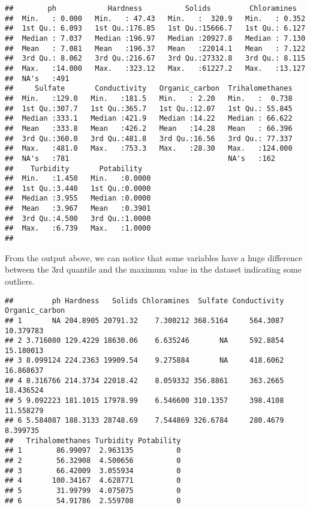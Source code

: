 \documentclass[
]{article}
\begin{document}
\begin{verbatim}
##        ph            Hardness          Solids         Chloramines    
##  Min.   : 0.000   Min.   : 47.43   Min.   :  320.9   Min.   : 0.352  
##  1st Qu.: 6.093   1st Qu.:176.85   1st Qu.:15666.7   1st Qu.: 6.127  
##  Median : 7.037   Median :196.97   Median :20927.8   Median : 7.130  
##  Mean   : 7.081   Mean   :196.37   Mean   :22014.1   Mean   : 7.122  
##  3rd Qu.: 8.062   3rd Qu.:216.67   3rd Qu.:27332.8   3rd Qu.: 8.115  
##  Max.   :14.000   Max.   :323.12   Max.   :61227.2   Max.   :13.127  
##  NA's   :491                                                         
##     Sulfate       Conductivity   Organic_carbon  Trihalomethanes  
##  Min.   :129.0   Min.   :181.5   Min.   : 2.20   Min.   :  0.738  
##  1st Qu.:307.7   1st Qu.:365.7   1st Qu.:12.07   1st Qu.: 55.845  
##  Median :333.1   Median :421.9   Median :14.22   Median : 66.622  
##  Mean   :333.8   Mean   :426.2   Mean   :14.28   Mean   : 66.396  
##  3rd Qu.:360.0   3rd Qu.:481.8   3rd Qu.:16.56   3rd Qu.: 77.337  
##  Max.   :481.0   Max.   :753.3   Max.   :28.30   Max.   :124.000  
##  NA's   :781                                     NA's   :162      
##    Turbidity       Potability    
##  Min.   :1.450   Min.   :0.0000  
##  1st Qu.:3.440   1st Qu.:0.0000  
##  Median :3.955   Median :0.0000  
##  Mean   :3.967   Mean   :0.3901  
##  3rd Qu.:4.500   3rd Qu.:1.0000  
##  Max.   :6.739   Max.   :1.0000  
## 
\end{verbatim}

From the output above, we can notice that some variables have a huge
difference between the 3rd quantile and the maximum value in the dataset
indicating some outliers.

\begin{verbatim}
##         ph Hardness   Solids Chloramines  Sulfate Conductivity Organic_carbon
## 1       NA 204.8905 20791.32    7.300212 368.5164     564.3087      10.379783
## 2 3.716080 129.4229 18630.06    6.635246       NA     592.8854      15.180013
## 3 8.099124 224.2363 19909.54    9.275884       NA     418.6062      16.868637
## 4 8.316766 214.3734 22018.42    8.059332 356.8861     363.2665      18.436524
## 5 9.092223 181.1015 17978.99    6.546600 310.1357     398.4108      11.558279
## 6 5.584087 188.3133 28748.69    7.544869 326.6784     280.4679       8.399735
##   Trihalomethanes Turbidity Potability
## 1        86.99097  2.963135          0
## 2        56.32908  4.500656          0
## 3        66.42009  3.055934          0
## 4       100.34167  4.628771          0
## 5        31.99799  4.075075          0
## 6        54.91786  2.559708          0
\end{verbatim}
\end{document}
